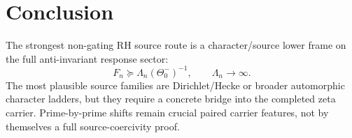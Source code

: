 \documentclass[11pt]{article}
\begin{document}
\section{Conclusion}
The strongest non-gating RH source route is a character/source lower frame on the full anti-invariant response sector:
\[
F_n\succeq\Lambda_n(\Theta_0^-)^{-1},\qquad \Lambda_n\to\infty.
\]
The most plausible source families are Dirichlet/Hecke or broader automorphic character ladders, but they require a concrete bridge into the completed zeta carrier. Prime-by-prime shifts remain crucial paired carrier features, not by themselves a full source-coercivity proof.
\end{document}
